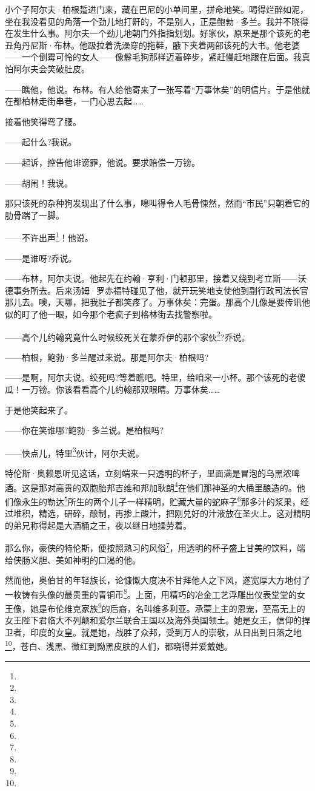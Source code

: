 \par 小个子阿尔夫·柏根踅进门来，藏在巴尼的小单间里，拼命地笑。喝得烂醉如泥，坐在我没看见的角落一个劲儿地打鼾的，不是别人，正是鲍勃·多兰。我并不晓得在发生什么事。阿尔夫一个劲儿地朝门外指指划划。好家伙，原来是那个该死的老丑角丹尼斯·布林。他趿拉着洗澡穿的拖鞋，腋下夹着两部该死的大书。他老婆——一个倒霉可怜的女人——像鬈毛狗那样迈着碎步，紧赶慢赶地跟在后面。我真怕阿尔夫会笑破肚皮。
\par ——瞧他，他说。布林。有人给他寄来了一张写着“万事休矣”的明信片。于是他就在都柏林走街串巷，一门心思去起……
\par 接着他笑得弯了腰。
\par ——起什么?我说。
\par ——起诉，控告他诽谤罪，他说。要求赔偿一万镑。
\par ——胡闹！我说。
\par 那只该死的杂种狗发现出了什么事，嗥叫得令人毛骨悚然，然而“市民”只朝着它的肋骨踹了一脚。
\par ——不许出声\footnote{}！他说。
\par ——是谁呀?乔说。
\par ——布林，阿尔夫说。他起先在约翰·亨利·门顿那里，接着又绕到考立斯——沃德事务所去。后来汤姆·罗赤福特碰见了他，就开玩笑地支使他到副行政司法长官那儿去。噢，天哪，把我肚子都笑疼了。万事休矣：完蛋。那高个儿像是要传讯他似的盯了他一眼，如今那个老疯子到格林街去找警察啦。
\par ——高个儿约翰究竟什么时候绞死关在蒙乔伊的那个家伙\footnote{}?乔说。
\par ——柏根，鲍勃·多兰醒过来说。那是阿尔夫·柏根吗?
\par ——是啊，阿尔夫说。绞死吗?等着瞧吧。特里，给咱来一小杯。那个该死的老傻瓜！一万镑。你该看看高个儿约翰那双眼睛。万事休矣……
\par 于是他笑起来了。
\par ——你在笑谁哪?鲍勃·多兰说。是柏根吗?
\par ——快点儿，特里\footnote{}伙计，阿尔夫说。
\par 特伦斯·奥赖恩听见这话，立刻端来一只透明的杯子，里面满是冒泡的乌黑浓啤酒。这是那对高贵的双胞胎邦吉维和邦加耿朗\footnote{}在他们那神圣的大桶里酿造的。他们像永生的勒达\footnote{}所生的两个儿子一样精明，贮藏大量的蛇麻子\footnote{}那多汁的浆果，经过堆积，精选，研碎，酿制，再掺上酸汁，把刚兑好的汁液放在圣火上。这对精明的弟兄称得起是大酒桶之王，夜以继日地操劳着。
\par 那么你，豪侠的特伦斯，便按照熟习的风俗\footnote{}，用透明的杯子盛上甘美的饮料，端给侠肠义胆、美如神明的口渴的他。
\par 然而他，奥伯甘的年轻族长，论慷慨大度决不甘拜他人之下风，遂宽厚大方地付了一枚铸有头像的最贵重的青铜币\footnote{}。上面，用精巧的冶金工艺浮雕出仪表堂堂的女王像，她是布伦维克家族\footnote{}的后裔，名叫维多利亚。承蒙上主的恩宠，至高无上的女王陛下君临大不列颠和爱尔兰联合王国以及海外英国领土。她是女王，信仰的捍卫者，印度的女皇。就是她，战胜了众邦，受到万人的崇敬，从日出到日落之地\footnote{}，苍白、浅黑、微红到黝黑皮肤的人们，都晓得并爱戴她。
